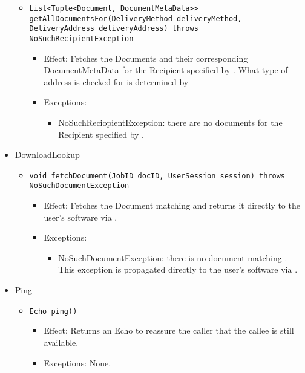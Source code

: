 \begin{itemize}
\begin{itemize}
		\item \texttt{List<Tuple<Document, DocumentMetaData>> getAllDocumentsFor(DeliveryMethod deliveryMethod, DeliveryAddress deliveryAddress) throws NoSuchRecipientException}
		\begin{itemize}
			\item Effect: Fetches the Documents and their corresponding DocumentMetaData for the Recipient specified by . What type of address is checked for is determined by 
			\item Exceptions: 
			\begin{itemize}
				\item NoSuchReciopientException: there are no documents for the Recipient specified by .
			\end{itemize}
		\end{itemize}
	\end{itemize}

    \item DownloadLookup
	\begin{itemize}
		\item \texttt{void fetchDocument(JobID docID, UserSession session) throws NoSuchDocumentException}
		\begin{itemize}
			\item Effect: Fetches the Document matching  and returns it directly to the user's software via .
			\item Exceptions:
			\begin{itemize}
				\item NoSuchDocumentException: there is no document matching . This exception is propagated directly to the user's software via .
			\end{itemize}
		\end{itemize}
	\end{itemize}

	\item Ping
	\begin{itemize}
		\item \texttt{Echo ping()}
		\begin{itemize}
			\item Effect: Returns an Echo to reassure the caller that the callee is still available.
			\item Exceptions: None.
		\end{itemize}
	\end{itemize}
\end{itemize}

